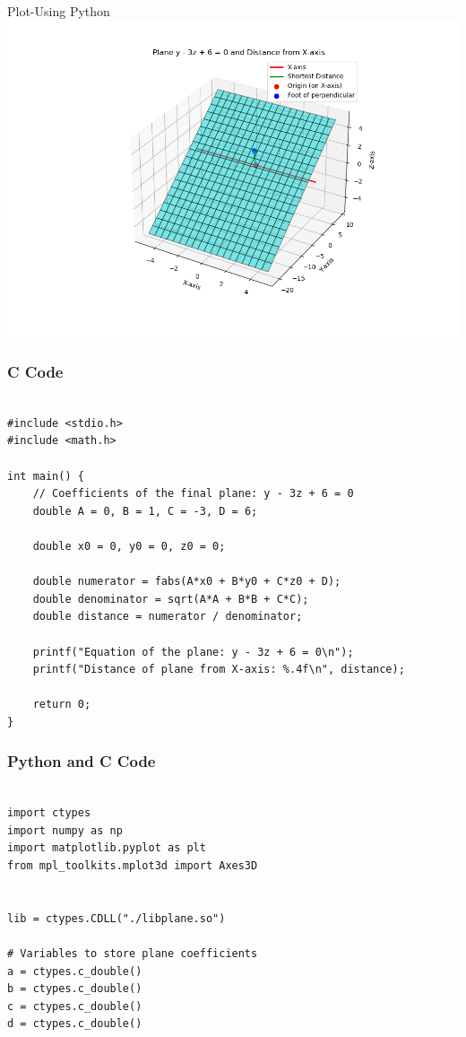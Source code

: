 \documentclass{beamer}
\begin{document}
\begin{frame}{Plot-Using Python}
    \centering
    \includegraphics[width=\columnwidth, height=0.8\textheight, keepaspectratio]{figs/fig8.png}     
\end{frame}

\begin{frame}[fragile]
\frametitle{ C Code}

\begin{lstlisting}

#include <stdio.h>
#include <math.h>

int main() {
    // Coefficients of the final plane: y - 3z + 6 = 0
    double A = 0, B = 1, C = -3, D = 6;

    double x0 = 0, y0 = 0, z0 = 0;

    double numerator = fabs(A*x0 + B*y0 + C*z0 + D);
    double denominator = sqrt(A*A + B*B + C*C);
    double distance = numerator / denominator;

    printf("Equation of the plane: y - 3z + 6 = 0\n");
    printf("Distance of plane from X-axis: %.4f\n", distance);

    return 0;
}
\end{lstlisting}

\end{frame}


\begin{frame}[fragile]
\frametitle{Python and C Code}

\begin{lstlisting}

import ctypes
import numpy as np
import matplotlib.pyplot as plt
from mpl_toolkits.mplot3d import Axes3D


lib = ctypes.CDLL("./libplane.so")

# Variables to store plane coefficients
a = ctypes.c_double()
b = ctypes.c_double()
c = ctypes.c_double()
d = ctypes.c_double()
\end{lstlisting}

\end{frame}
\end{document}
